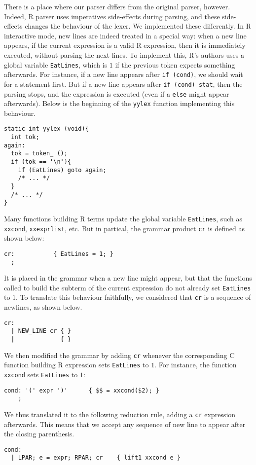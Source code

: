 \documentclass{article}
\newcommand\R{R}
\newcommand\Cn{C}
\begin{document}
There is a place where our parser differs from the original parser, however.
Indeed, \R{} parser uses imperatives side-effects during parsing,
and these side-effects changes the behaviour of the lexer.
We implemented these differently.
In \R{} interactive mode, new lines are indeed treated in a special way:
when a new line appears, if the current expression is a valid \R{} expression,
then it is immediately executed, without parsing the next lines.
To implement this, \R{}'s authors uses a global variable
\texttt{EatLines}, which is \(1\) if the previous token
expects something afterwards.
For instance, if a new line appears after \texttt{if (cond)},
we should wait for a statement first.
But if a new line appears after \texttt{if (cond) stat},
then the parsing stops, and the expression is executed
(even if a \texttt{else} might appear afterwards).
Below is the beginning of the \texttt{yylex} function
implementing this behaviour.
\begin{verbatim}
static int yylex (void){
  int tok;
again:
  tok = token_ ();
  if (tok == '\n'){
    if (EatLines) goto again;
    /* ... */
  }
  /* ... */
}
\end{verbatim}
Many functions building \R{} terms update the global variable \texttt{EatLines},
such as \texttt{xxcond}, \texttt{xxexprlist}, etc.
But in partical, the grammar product \texttt{cr} is defined as shown below:
\begin{verbatim}
cr:           { EatLines = 1; }
  ;
\end{verbatim}
It is placed in the grammar when a new line might appear,
but that the functions called to build the subterm of the current expression
do not already set \texttt{EatLines} to \(1\).
To translate this behaviour faithfully,
we considered that \texttt{cr} is a sequence of newlines,
as shown below.
\begin{verbatim}
cr:
  | NEW_LINE cr { }
  |             { }
\end{verbatim}
We then modified the grammar by adding \texttt{cr} whenever the corresponding \Cn{}
function building \R{} expression sets \texttt{EatLines} to \(1\).
For instance, the function \texttt{xxcond} sets \texttt{EatLines} to \(1\):
\begin{verbatim}
cond: '(' expr ')'      { $$ = xxcond($2); }
    ;
\end{verbatim}
We thus translated it to the following reduction rule,
adding a \texttt{cr} expression afterwards.
This means that we accept any sequence of new line to appear after the closing parenthesis.
\begin{verbatim}
cond:
  | LPAR; e = expr; RPAR; cr    { lift1 xxcond e }
\end{verbatim}
\end{document}
